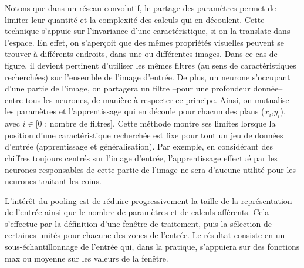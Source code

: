 \documentclass[12pt]{report}
\begin{document}
Notons que dans un réseau convolutif, le partage des paramètres permet de limiter leur quantité et la complexité des calculs qui en découlent.
Cette technique s’appuie sur l’invariance d’une caractéristique, si on la translate dans l’espace.
En effet, on s’aperçoit que des mêmes propriétés visuelles peuvent se trouver à différents endroits, dans une ou différentes images.
Dans ce cas de figure, il devient pertinent d’utiliser les mêmes filtres (au sens de caractéristiques recherchées) sur l’ensemble de l’image d’entrée.
De plus, un neurone s’occupant d’une partie de l’image, on partagera un filtre –pour une profondeur donnée– entre tous les neurones, de manière à respecter ce principe.
Ainsi, on mutualise les paramètres et l’apprentissage qui en découle pour chacun des plans ($x_{i}$,$y_{i}$), avec $i  \in [0$ ; nombre de filtres$]$.
Cette méthode montre ses limites lorsque la position d’une caractéristique recherchée est fixe pour tout un jeu de données d’entrée (apprentissage et généralisation).
Par exemple, en considérant des chiffres toujours centrés sur l’image d’entrée, l’apprentissage effectué par les neurones responsables de cette partie de l’image ne sera d’aucune utilité pour les neurones traitant les coins.
\par
L’intérêt du pooling est de réduire progressivement la taille de la représentation de l’entrée ainsi que le nombre de paramètres et de calculs afférents.
Cela s’effectue par la définition d’une fenêtre de traitement, puis la sélection de certaines unités pour chacune des zones de l’entrée.
Le résultat consiste en un sous-échantillonnage de l’entrée qui, dans la pratique, s’appuiera sur des fonctions max ou moyenne sur les valeurs de la fenêtre.

\printglossaries
\end{document}
